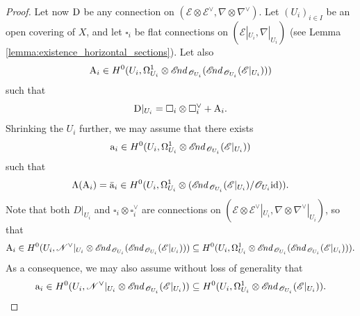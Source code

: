 \documentclass[english,10pt]{amsart}
\newcommand{\sE}{\mathscr{E}}
\newcommand{\sN}{\mathscr{N}}
\newcommand{\sO}{\mathscr{O}}
\theoremstyle{definition}
\theoremstyle{remark}
\numberwithin{equation}{section}
\begin{document}
\begin{proof}
Let now $\textup{D}$ be any connection on $(\sE\otimes\sE^\vee,\nabla\otimes\nabla^\vee)$. Let $(U_i)_{i\in I}$ be an open covering of $X$, and let $\square_i$ be flat connections on $(\sE|_{U_i},\nabla|_{U_i})$ (see Lemma \ref{lemma:existence_horizontal_sections}). Let also
\[
\textup{A}_i \in H^0(U_i,\Omega_{U_i}^1 \otimes \sE\hspace{-0.07cm}\textit{nd}_{\,\sO_{U_i}}(\sE\hspace{-0.07cm}\textit{nd}_{\,\sO_{U_i}}(\sE|_{U_i})))
\] 
such that 
\[
\textup{D}|_{U_i}=\square_i \otimes \square^\vee_i + \textup{A}_i.
\]
Shrinking the $U_i$ further, we may assume that there exists
\[
\textup{a}_i \in H^0(U_i,\Omega_{U_i}^1 \otimes \sE\hspace{-0.07cm}\textit{nd}_{\,\sO_{U_i}}(\sE|_{U_i}))
\]
such that 
\[
\Lambda(\textup{A}_i)=\bar{\textup{a}}_i \in H^0(U_i,\Omega_{U_i}^1 \otimes (\sE\hspace{-0.07cm}\textit{nd}_{\,\sO_{U_i}}(\sE|_{U_i})/\sO_{U_i}\textup{id})).
\]
Note that both $D|_{U_i}$ and $\square_i \otimes \square^\vee_i$ are connections on $(\sE\otimes\sE^\vee|_{U_i},\nabla\otimes\nabla^\vee|_{U_i})$, so that
\[
\textup{A}_i \in H^0(U_i,\sN^\vee|_{U_i} \otimes \sE\hspace{-0.07cm}\textit{nd}_{\,\sO_{U_i}}(\sE\hspace{-0.07cm}\textit{nd}_{\,\sO_{U_i}}(\sE|_{U_i}))) \subseteq H^0(U_i,\Omega_{U_i}^1 \otimes \sE\hspace{-0.07cm}\textit{nd}_{\,\sO_{U_i}}(\sE\hspace{-0.07cm}\textit{nd}_{\,\sO_{U_i}}(\sE|_{U_i}))).
\]
As a consequence, we may also assume without loss of generality that 
\[
\textup{a}_i \in H^0(U_i,\sN^\vee|_{U_i} \otimes \sE\hspace{-0.07cm}\textit{nd}_{\,\sO_{U_i}}(\sE|_{U_i})) \subseteq H^0(U_i,\Omega_{U_i}^1 \otimes \sE\hspace{-0.07cm}\textit{nd}_{\,\sO_{U_i}}(\sE|_{U_i})).
\]


\end{proof}
\end{document}
